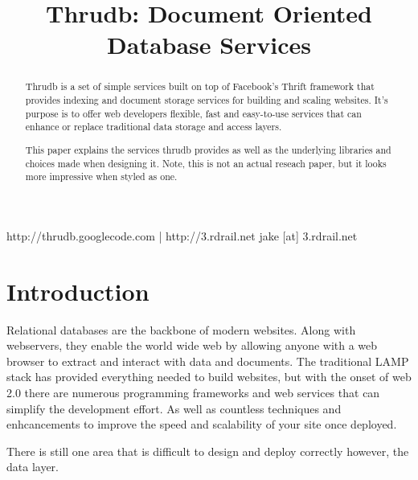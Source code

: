 \documentclass[nocopyrightspace,blockstyle]{sigplanconf}
\begin{document}


\title{Thrudb: Document Oriented Database Services}
\subtitle{}

	   {http://thrudb.googlecode.com | http://3.rdrail.net}
           {jake [at] 3.rdrail.net}
\maketitle

\begin{abstract}
Thrudb is a set of simple services built on top of Facebook’s Thrift framework that provides 
indexing and document storage services for building and scaling websites. 
It’s purpose is to offer web developers flexible, fast and easy-to-use services that can 
enhance or replace traditional data storage and access layers.
   
This paper explains the services thrudb provides as well as the underlying libraries and choices 
made when designing it.  Note, this is not an actual reseach paper, but it looks more impressive 
when styled as one.
\end{abstract}




\section{Introduction}
Relational databases are the backbone of modern websites.  Along with webservers, they enable the 
world wide web by allowing anyone with a web browser to extract and interact with data and documents.  
The traditional LAMP stack has provided everything needed to build websites, but with the onset of web 2.0
there are numerous programming frameworks and web services that can simplify the development effort. 
As well as countless techniques and enhcancements to improve the speed and scalability of your site once deployed.

There is still one area that is difficult to design and deploy correctly however, the data layer.
 
\end{document}
